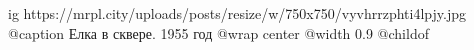  
 
 
 
 

\ifcmt
  ig https://mrpl.city/uploads/posts/resize/w/750x750/vyvhrrzphti4lpjy.jpg
	@caption Елка в сквере. 1955 год
  @wrap center
  @width 0.9
  @childof 
\fi
